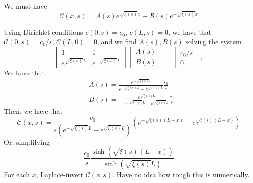 \documentclass[]{article}
\begin{document}
We must have
\begin{equation}
\mathcal{C}(x,s) = A(s) e^{\sqrt{\xi(s)} x} + B(s) e^{-\sqrt{\xi(s)} x}
\end{equation}

Using Dirichlet conditions $c(0,s) = c_0$, $c(L,s) = 0$, we have that $\mathcal{C}(0,s) = c_0/s$, $\mathcal{C}(L,0) = 0$, and we find $A(s), B(s)$ solving the system
\begin{equation}
\begin{bmatrix}
1 & 1 \\
e^{\sqrt{\xi(s)} L} & e^{-\sqrt{\xi(s)} L}
\end{bmatrix} \begin{bmatrix} A(s) \\ B(s) \end{bmatrix} = \begin{bmatrix} c_0/s \\ 0 \end{bmatrix},
\end{equation}
We have that
\begin{equation}
\begin{split}
& A(s) = \frac{e^{-\sqrt{\xi(s)} L}}{e^{-\sqrt{\xi(s)} L} - e^{\sqrt{\xi(s)} L}} \frac{c_0}{s} \\
& B(s) = -\frac{e^{\sqrt{\xi(s)} L}}{e^{-\sqrt{\xi(s)} L} - e^{\sqrt{\xi(s)} L}} \frac{c_0}{s}
\end{split}
\end{equation}
Then, we have that
\begin{equation}
\mathcal{C}(x,s) = \frac{c_0}{s \left(e^{-\sqrt{\xi(s)} L} - e^{\sqrt{\xi(s)} L}\right)} \left(e^{-\sqrt{\xi(s)}(L-x)} - e^{\sqrt{\xi(s)}(L-x)}\right)
\end{equation}
Or, simplifying
\begin{equation}
\frac{c_0}{s} \frac{\sinh(\sqrt{\xi(s)}(L-x))}{\sinh(\sqrt{\xi(s)} L)}
\end{equation}
For each $x$, Laplace-invert $\mathcal{C}(x,s)$. Have no idea how tough this is numerically.
\end{document}
